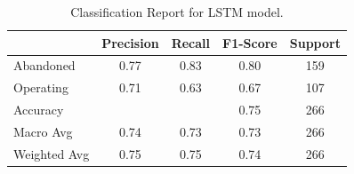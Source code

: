 \begin{table}[h!]
\centering
\begin{tabular}{lcccc}
\hline
    & Precision & Recall & F1-Score & Support \\
\hline
Abandoned & 0.77 & 0.83 & 0.80 & 159 \\
Operating & 0.71 & 0.63 & 0.67 & 107 \\
\hline
Accuracy & & & 0.75 & 266 \\
Macro Avg & 0.74 & 0.73 & 0.73 & 266 \\
Weighted Avg & 0.75 & 0.75 & 0.74 & 266 \\
\hline
\end{tabular}
\caption{Classification Report for LSTM model.}
\label{tab:lstm_res}
\end{table}

\newpage
\hspace{100pt}